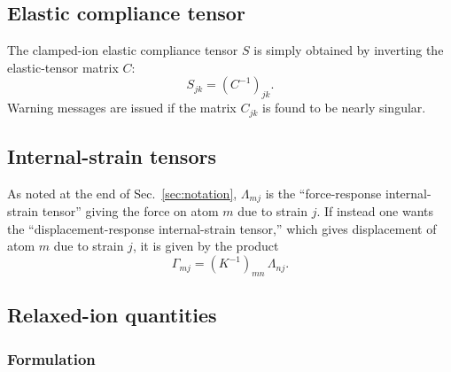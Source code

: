 \documentclass[11pt,fleqn]{article}
\def\beq{\begin{equation}}
\def\eeq{\end{equation}}
\begin{document}
\subsection{Elastic compliance tensor}
\label{sec:compliance}

The clamped-ion elastic compliance tensor $S$ is simply obtained
by inverting the elastic-tensor matrix $C$:
%
\beq
S_{jk}=(C^{-1})_{jk} .
\eeq
%
Warning messages
are issued if the matrix $C_{jk}$ is found to be nearly singular.

\subsection{Internal-strain tensors}
\label{sec:internal}

As noted at the end of Sec.~\ref{sec:notation}, $\Lambda_{mj}$
is the ``force-response internal-strain tensor'' giving the
force on atom $m$ due to strain $j$.  If instead one wants the
``displacement-response internal-strain tensor,'' which gives
displacement of atom $m$ due to strain $j$, it is given by
the product
%
\beq
\Gamma_{mj}=(K^{-1})_{mn}\,\Lambda_{nj}  .
\eeq
%

\subsection{Relaxed-ion quantities}

\subsubsection{Formulation}
\label{sec:formulation}
\end{document}
